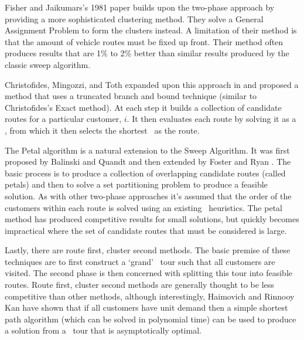 
Fisher and Jaikumars's 1981 paper\cite{FJ:1981} builds upon the two-phase approach by providing a more sophisticated clustering method. They solve a General Assignment Problem to form the clusters instead. A limitation of their method is that the amount of vehicle routes must be fixed up front. Their method often produces results that are 1\% to 2\% better than similar results produced by the classic sweep algorithm\cite{TV2001}. 

Christofides, Mingozzi, and Toth expanded upon this approach in \cite{CMT:1981} and proposed a method that uses a truncated branch and bound technique (similar to Christofides's Exact method). At each step it builds a collection of candidate routes for a particular customer, $i$. It then evaluates each route by solving it as a \TSP, from which it then selects the shortest \TSP\ as the route.

The Petal algorithm is a natural extension to the Sweep Algorithm. It was first proposed by Balinski and Quandt \cite{balinski:64} and then extended by Foster and Ryan \cite{FR:1976}. The basic process is to produce a collection of overlapping candidate routes (called petals) and then to solve a set partitioning problem to produce a feasible solution. As with other two-phase approaches it's assumed that the order of the customers within each route is solved using an existing \TSP\ heuristics. The petal method has produced competitive results for small solutions, but quickly becomes impractical where the set of candidate routes that must be considered is large.  

Lastly, there are route first, cluster second methods. The basic premise of these techniques are to first construct a `grand' \TSP\ tour such that all customers are visited. The second phase is then concerned with splitting this tour into feasible routes. Route first, cluster second methods are generally thought to be less competitive than other methods\cite{Laporte:1999}, although interestingly, Haimovich and Rinnooy Kan have shown that if all customers have unit demand then a simple shortest path algorithm (which can be solved in polynomial time) can be used to produce a solution from a \TSP\ tour that is asymptotically optimal\cite{HK:1985}.

